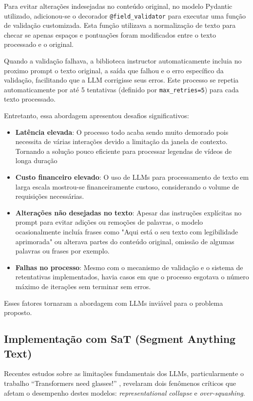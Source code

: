 \documentclass[tcc,capa]{texufpel}
\begin{document}
Para evitar alterações indesejadas no conteúdo original, no modelo Pydantic utilizado, adicionou-se o decorador \verb|@field_validator| para executar
uma função de validação customizada. Esta função utilizava a normalização
de texto para checar se apenas espaços e pontuações foram modificados
entre o texto processado e o original. 

Quando a validação falhava, a
biblioteca instructor automaticamente incluia no proximo prompt o texto
original, a saída que falhou e o erro específico da validação, facilitando que a LLM corrigisse seus erros. Este processo
se repetia automaticamente por até 5 tentativas (definido por
\verb|max_retries=5|) para cada texto processado.

Entretanto, essa abordagem apresentou desafios significativos:
\begin{itemize}
  \item \textbf{Latência elevada}: O processo todo acaba sendo muito demorado pois necessita de várias interações devido a limitação da janela de contexto. Tornando a solução pouco eficiente para processar legendas de vídeos de longa duração
  \item \textbf{Custo financeiro elevado}: O uso de LLMs para processamento de texto em larga escala mostrou-se financeiramente custoso, considerando o volume de requisições necessárias.
  \item \textbf{Alterações não desejadas no texto}: Apesar das instruções explícitas no prompt para evitar adições ou remoções de palavras, o modelo ocasionalmente incluía frases como "Aqui está o seu texto com legibilidade aprimorada" ou alterava partes do conteúdo original, omissão de algumas palavras ou frases por exemplo.
  \item \textbf{Falhas no processo}: Mesmo com o mecanismo de validação e o sistema de retentativas implementados, havia casos em que o processo esgotava o número máximo de iterações sem terminar sem erros.
\end{itemize}

Esses fatores tornaram a abordagem com LLMs inviável para o problema proposto.

\subsection{Implementação com SaT (Segment Anything Text)}

Recentes estudos sobre as limitações fundamentais dos LLMs, particularmente o trabalho ``Transformers need glasses!'' \cite{barbero2024transformers}, revelaram dois fenômenos críticos que afetam o desempenho destes modelos: \textit{representational collapse} e \textit{over-squashing}.
\end{document}
